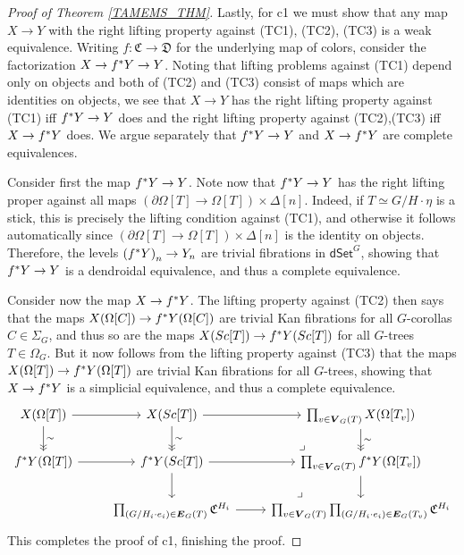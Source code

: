 \documentclass[a4paper,10pt
,draft
]{article}%
\numberwithin{equation}{section}
\numberwithin{figure}{section}
\theoremstyle{definition} %
\newcommand{\1}{\ensuremath{\mathbbm 1}}%
\begin{document}
\begin{proof}[Proof of Theorem \ref{TAMEMS_THM}]
	
Lastly, for c1 we must show that any map $X \to Y$ with the right lifting property against (TC1), (TC2), (TC3) is a weak equivalence.
Writing $f \colon \mathfrak{C} \to \mathfrak{D}$ for the underlying map of colors,
consider the factorization $X \to f^{\**}Y \to Y$.
%
Noting that lifting problems against (TC1) depend only on objects and both of (TC2) and (TC3) consist of maps which are identities on objects,
we see that $X \to Y$ has the right lifting property against (TC1) iff 
$f^{\**} Y \to Y$ does
and the right lifting property against 
(TC2),(TC3) iff $X \to f^{\**}Y$ does.
We argue separately that 
$f^{\**} Y \to Y$ and $X \to f^{\**}Y$
are complete equivalences.

Consider first the map $f^{\**} Y \to Y$. Note now that $f^{\**} Y \to Y$ has the right lifting proper against all maps 
$\left(\partial \Omega[T] \to \Omega[T] \right) \times \Delta[n]$.
Indeed, if $T \simeq G/H \cdot \eta$ is a stick, this is precisely the lifting condition against (TC1), and otherwise it follows automatically since $\left(\partial \Omega[T] \to \Omega[T] \right) \times \Delta[n]$ is the identity on objects.
Therefore, the levels 
$\left(f^{\**} Y \right)_n \to Y_n$ are trivial fibrations in 
$\mathsf{dSet}^G$, showing that 
$f^{\**} Y \to Y$ is a dendroidal equivalence, 
and thus a complete equivalence. 


Consider now the map $X \to f^{\**} Y$.
The lifting property against (TC2) then says that the maps
$X(\Omega[C]) \to f^{\**} Y (\Omega[C])$
are trivial Kan fibrations for all $G$-corollas $C \in \Sigma_G$,
and thus so are the maps
$X(Sc[T]) \to f^{\**} Y (Sc[T])$ for all $G$-trees $T \in \Omega_G$.
But it now follows from the lifting property against
(TC3) that the maps 
$X(\Omega[T]) \to f^{\**} Y (\Omega[T])$
are trivial Kan fibrations for all $G$-trees,
showing that $X \to f^{\**} Y$ is a simplicial equivalence, and thus a complete equivalence. 
\[
\begin{tikzcd}
	X(\Omega[T]) \ar{r} \ar[->>]{d}{\sim} &
	X(Sc[T]) \ar{r} \ar[->>]{d}{\sim} &
	\prod_{v \in \boldsymbol{V}_G(T)} X(\Omega[T_v])
	\ar[->>]{d}{\sim}
\\
	f^{\**} Y(\Omega[T]) \ar{r} &
	f^{\**} Y(Sc[T]) \ar{r} \ar{d} &
	\prod_{v \in \boldsymbol{V}_G(T)} f^{\**} Y
	(\Omega[T_v]) \ar{d}
	\arrow[ul, phantom, "\lrcorner", very near start]
\\
&
	\prod_{(G/H_i \cdot e_i) \in \boldsymbol{E}_G(T)} 
	\mathfrak{C}^{H_i} \ar{r}  &
	\prod_{v \in \boldsymbol{V}_G(T)}
	\prod_{(G/H_i \cdot e_i) \in \boldsymbol{E}_G(T_v)} 
	\mathfrak{C}^{H_i} 
	\arrow[ul, phantom, "\lrcorner", very near start]
\end{tikzcd}
\]
This completes the proof of c1, finishing the proof.
\end{proof}
\end{document}
